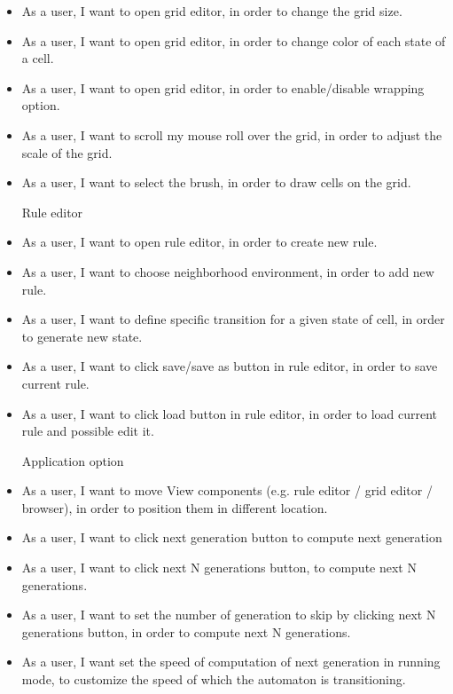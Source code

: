 \documentclass{article}
\begin{document}
\begin{itemize}	
	\item 
		As a user, 
		I want to open grid editor,
		in order to change the grid size.

	\item 
		As a user, 
		I want to open grid editor,
		in order to change color of each state of a cell.

	\item 
		As a user, 
		I want to open grid editor,
		in order to enable/disable wrapping option.

	\item 
		As a user, 
		I want to scroll my mouse roll over the grid,
		in order to adjust the scale of the grid.

	\item 
		As a user, 
		I want to select the brush,
		in order to draw cells on the grid.

	\vspace{30pt}
	Rule editor
	
	\item 
		As a user,
		I want to open rule editor,
		in order to create new rule.
		
	\item 
		As a user,
		I want to choose neighborhood environment,
		in order to add new rule.
		
	\item 
		As a user,
		I want to define specific transition for a given state of cell,
		in order to generate new state.
		
	\item 
		As a user,
		I want to click save/save as button in rule editor,
		in order to save current rule.

	\item 
		As a user,
		I want to click load button in rule editor,
		in order to load current rule and possible edit it.

	\vspace{30pt}
	Application option
	
	\item 
		As a user,
		I want to move View components (e.g. rule editor / grid editor / browser),
		in order to position them in different location.
	\item 
		As a user,
		I want to click next generation button 
		to compute next generation
	\item 
		As a user,
		I want to click next N generations button,
		to compute next N generations.
	\item 
		As a user,
		I want to set the number of generation to skip by clicking next N generations button,
		in order to compute next N generations.
	\item 
		As a user,
		I want set the speed of computation of next generation in running mode,
		to customize the speed of which the automaton is transitioning. \\
		

\end{itemize}
\end{document}
